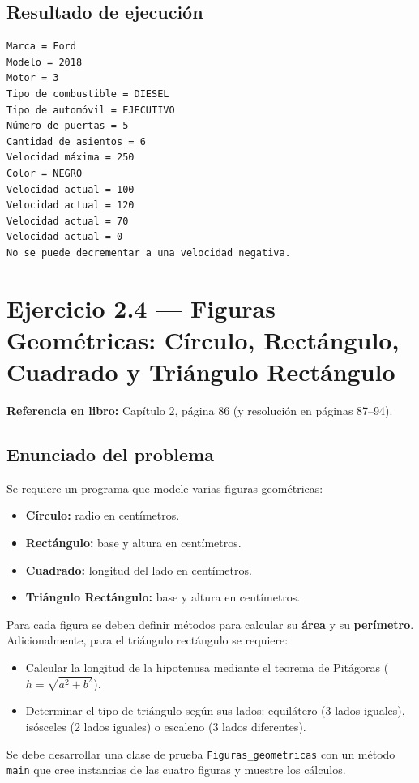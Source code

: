\documentclass[11pt,a4paper]{article}
\begin{document}
\subsection{Resultado de ejecución}
\begin{verbatim}
Marca = Ford
Modelo = 2018
Motor = 3
Tipo de combustible = DIESEL
Tipo de automóvil = EJECUTIVO
Número de puertas = 5
Cantidad de asientos = 6
Velocidad máxima = 250
Color = NEGRO
Velocidad actual = 100
Velocidad actual = 120
Velocidad actual = 70
Velocidad actual = 0
No se puede decrementar a una velocidad negativa.
\end{verbatim}

\newpage

\section{Ejercicio 2.4 — Figuras Geométricas: Círculo, Rectángulo, Cuadrado y Triángulo Rectángulo}
\textbf{Referencia en libro:} Capítulo 2, página 86 (y resolución en páginas 87--94).

\subsection{Enunciado del problema}
Se requiere un programa que modele varias figuras geométricas:
\begin{itemize}
    \item \textbf{Círculo:} radio en centímetros.
    \item \textbf{Rectángulo:} base y altura en centímetros.
    \item \textbf{Cuadrado:} longitud del lado en centímetros.
    \item \textbf{Triángulo Rectángulo:} base y altura en centímetros.
\end{itemize}

Para cada figura se deben definir métodos para calcular su \textbf{área} y su \textbf{perímetro}. Adicionalmente, para el triángulo rectángulo se requiere:
\begin{itemize}
    \item Calcular la longitud de la hipotenusa mediante el teorema de Pitágoras ($h = \sqrt{a^2 + b^2}$).
    \item Determinar el tipo de triángulo según sus lados: equilátero (3 lados iguales), isósceles (2 lados iguales) o escaleno (3 lados diferentes).
\end{itemize}
Se debe desarrollar una clase de prueba \texttt{Figuras\_geometricas} con un método \texttt{main} que cree instancias de las cuatro figuras y muestre los cálculos.
\end{document}
